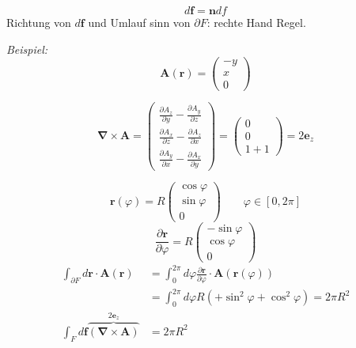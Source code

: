 \documentclass[titlepage,11pt,a4paper,ngerman]{report}
\newcommand{\ob}[1]{\overbrace{#1}}
\renewcommand{\vec}[1]{\boldsymbol{#1}}
\begin{document}


$$d\vec{f} = \vec{n} df$$
Richtung von $d\vec{f}$ und Umlauf sinn von $\partial F$: rechte Hand Regel.

\emph{Beispiel:}
\begin{equation*}
\vec{A}(\vec{r}) = \begin{pmatrix}
-y \\ x \\ 0
\end{pmatrix}
\end{equation*}






\begin{equation*}
\vec{\nabla} \times \vec{A} = \begin{pmatrix}
\frac{\partial A_z}{\partial y} - \frac{\partial A_y}{\partial z} \\
\frac{\partial A_x}{\partial z} - \frac{\partial A_z}{\partial x} \\
\frac{\partial A_y}{\partial x} - \frac{\partial A_x}{\partial y}
\end{pmatrix} = \begin{pmatrix}
0 \\ 0 \\ 1 + 1
\end{pmatrix} = 2 \vec{e}_z
\end{equation*}






\begin{equation*}
\vec{r}(\varphi) = R \begin{pmatrix}
\cos \varphi \\ \sin \varphi \\ 0
\end{pmatrix} \qquad \varphi \in [0,2\pi]
\end{equation*}
\begin{equation*}
\frac{\partial \vec{r}}{\partial \varphi} = R \begin{pmatrix}
- \sin \varphi \\ \cos \varphi \\ 0
\end{pmatrix}
\end{equation*}
\begin{align*}
\int_{\partial F} d \vec{r} \cdot \vec{A}(\vec{r}) &= \int_{0}^{2 \pi} d \varphi \frac{\partial \vec{r}}{\partial \varphi} \cdot \vec{A}( \vec{r} ( \varphi)) \\
&= \int_{0}^{2 \pi} d \varphi R ( + \sin^2 \varphi + \cos^2 \varphi) = 2 \pi R^2\\
\int_F d\vec{f} \ob{\left(\vec{\nabla} \times  \vec{A}\right)}^{2 \vec{e}_z} &= 2 \pi R^2
\end{align*}
\end{document}

